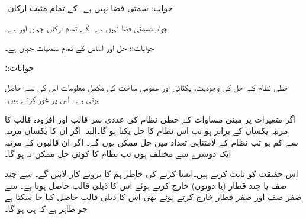 جواب: سمتی فضا نہیں ہے۔
 کے تمام  مثبت ارکان۔

جواب:سمتی فضا نہیں ہے۔
 کے تمام ارکان جہاں  اور  ہے۔

جوابات:؛ حل  اور اساس 
 کے تمام سمتیات جہاں  ہے۔

جوابات:؛ 

خطی نظام کے حل کی وجودیت، یکتائی اور عمومی ساخت کی مکمل معلومات اس کی  سے حاصل ہوتی ہے۔ اس پر غور کرتے ہیں۔

اگر  متغیرات پر مبنی مساوات کے خطی نظام کی عددی سر قالب اور افزودہ قالب کا مرتبہ یکساں  کے برابر ہو تب اس نظام کا حل یکتا ہو گا۔البتہ اگر ان کا یکساں مرتبہ  سے کم ہو تب نظام کے لامتناہی تعداد میں حل ممکن ہوں گے۔ اگر ان قالبوں کے مرتبہ ایک دوسرے سے مختلف ہوں تب نظام کا کوئی حل ممکن نہ ہو گا۔

اس حقیقت کو ثابت کرتے ہیں۔ایسا کرنے کی خاطر ہم  کا  بروئے کار لائیں گے۔ سے چند صف یا چند قطار (یا دونوں) خارج کرتے ہوئے اس کا ذیلی قالب حاصل ہوتا ہے۔  سے صفر صف اور صفر قطار خارج کرتے ہوئے بھی اس کا ذیلی قالب حاصل کیا جا سکتا ہے جو ظاہر ہے کہ  ہی ہو گا۔

